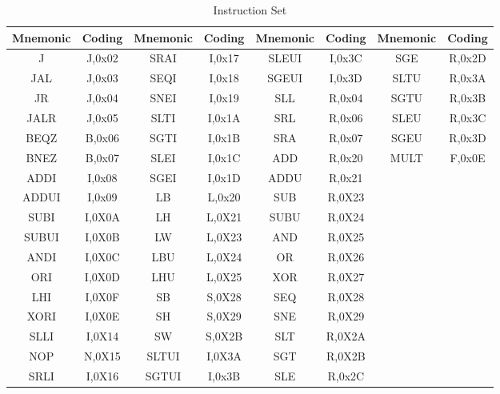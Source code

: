 \begin{table}[!htbp]
	\centering
	\begin{tabular}{|c|c|c|c|c|c|c|c|}                                         
	\toprule                                                         
	Mnemonic & Coding & Mnemonic & Coding & Mnemonic & Coding & Mnemonic & Coding\\                                              
	\midrule                                                          
	J		& J,0x02 	& SRAI	& I,0x17	& SLEUI	& I,0x3C	& SGE	& R,0x2D\\                                              
	JAL		& J,0x03 	& SEQI	& I,0x18	& SGEUI	& I,0x3D	& SLTU	& R,0x3A\\                                          
	JR		& J,0x04 	& SNEI	& I,0x19	& SLL	& R,0x04	& SGTU 	& R,0x3B\\						      
	JALR	& J,0x05 	& SLTI	& I,0x1A  	& SRL 	& R,0x06    & SLEU 	& R,0x3C\\                               
	BEQZ 	& B,0x06 	& SGTI 	& I,0x1B  	& SRA 	& R,0x07    & SGEU	& R,0x3D\\                               
	BNEZ 	& B,0x07 	& SLEI 	& I,0x1C  	& ADD	& R,0x20    & MULT	& F,0x0E\\                            
	ADDI	& I,0x08 	& SGEI	& I,0x1D  	& ADDU	& R,0x21	&&				\\     	                            
	ADDUI	& I,0x09 	& LB	& L,0x20  	& SUB	& R,0X23	&&				\\      
	SUBI	& I,0X0A 	& LH	& L,0X21  	& SUBU	& R,0X24	&&				\\      
    SUBUI   & I,0X0B 	& LW	& L,0X23  	& AND  	& R,0X25	&&				\\      
    ANDI    & I,0X0C 	& LBU  	& L,0X24  	& OR 	& R,0X26	&&				\\        
    ORI     & I,0X0D 	& LHU   & L,0X25  	& XOR   & R,0X27	&&				\\    
    LHI		& I,0X0F    & SB  	& S,0X28    & SEQ  	& R,0X28	&&				\\
	XORI    & I,0X0E 	& SH	& S,0X29  	& SNE	& R,0X29	&&				\\      
    SLLI    & I,0X14 	& SW   	& S,0X2B  	& SLT  	& R,0X2A	&&				\\      
    NOP     & N,0X15 	& SLTUI	& I,0X3A  	& SGT	& R,0X2B	&&				\\        
	SRLI	& I,0X16 	& SGTUI	& I,0x3B	& SLE	& R,0x2C	&&				\\										
	\bottomrule                                         
	\end{tabular}                                       
	\caption{Instruction Set}                           
	\label{tableIS} %
\end{table}

